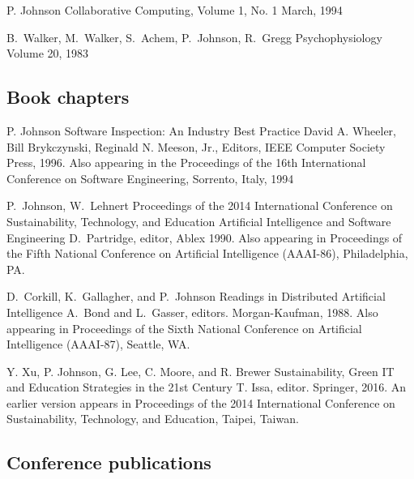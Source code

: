 \documentclass[11pt,letterpaper,sans]{moderncv} %
\begin{document}
          {P. Johnson}
          {Collaborative Computing, Volume 1, No. 1}
          {March, 1994}

          {B.~Walker, M.~Walker, S.~Achem, P.~Johnson, R.~Gregg}
          {Psychophysiology}
          {Volume 20, 1983}

\subsection{Book chapters}


          {P. Johnson}
          {Software Inspection:  An Industry Best Practice}  
          {David A. Wheeler, Bill Brykczynski, Reginald N. Meeson, Jr., Editors, IEEE Computer Society Press, 1996.
          Also appearing in the Proceedings of the 16th International Conference on Software Engineering, Sorrento, Italy, 1994}

          {P.~Johnson, W.~Lehnert}
Proceedings of the 2014 International Conference on Sustainability, Technology, and Education          {Artificial Intelligence and Software Engineering}
          {D.~Partridge, editor, Ablex 1990. Also appearing in Proceedings of the Fifth National Conference on
  Artificial Intelligence (AAAI-86), Philadelphia, PA.}

          {D.~Corkill, K.~Gallagher, and P.~Johnson}
          {Readings in Distributed Artificial Intelligence}
          {A.~Bond and L.~Gasser, editors.  Morgan-Kaufman, 1988.  Also appearing in Proceedings of the Sixth National Conference on Artificial Intelligence (AAAI-87), Seattle, WA.}

          {Y. Xu, P.  Johnson, G. Lee, C. Moore, and R. Brewer}
          {Sustainability, Green IT and Education Strategies in the 21st Century}
          {T. Issa, editor.  Springer, 2016.  An earlier version appears in Proceedings of the 2014 International Conference on Sustainability, Technology, and Education, Taipei, Taiwan.}

\subsection{Conference publications}
\end{document}
